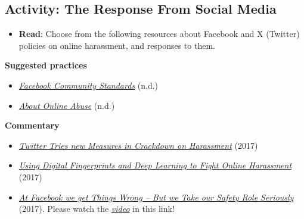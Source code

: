 \documentclass[
  letterpaper,
  DIV=11,
  numbers=noendperiod]{scrreprt}
\providecommand{\tightlist}{%
  \setlength{\itemsep}{0pt}\setlength{\parskip}{0pt}}\usepackage{longtable,booktabs,array}
\begin{document}
\subsection{Activity: The Response From Social
Media}\label{activity-the-response-from-social-media}

\begin{tcolorbox}[enhanced jigsaw, toprule=.15mm, colback=white, colframe=quarto-callout-note-color-frame, bottomtitle=1mm, leftrule=.75mm, coltitle=black, titlerule=0mm, rightrule=.15mm, colbacktitle=quarto-callout-note-color!10!white, left=2mm, title={Learning Activity}, opacitybacktitle=0.6, opacityback=0, breakable, toptitle=1mm, arc=.35mm, bottomrule=.15mm]

\begin{itemize}
\tightlist
\item
  \textbf{Read}: Choose from the following resources about Facebook and
  X (Twitter) policies on online harassment, and responses to them.
\end{itemize}

\textbf{Suggested practices}

\begin{itemize}
\tightlist
\item
  \emph{\href{https://transparency.fb.com/en-gb/policies/community-standards/?source=https\%3A\%2F\%2Fwww.facebook.com\%2Fcommunitystandards\%2F}{Facebook
  Community Standards}} (n.d.)
\item
  \href{https://help.twitter.com/en/safety-and-security/cyber-bullying-and-online-abuse}{\emph{About
  Online Abuse}} (n.d.)
\end{itemize}

\textbf{Commentary}

\begin{itemize}
\tightlist
\item
  \href{https://money.cnn.com/2017/02/07/technology/twitter-combat-harassment-features/index.html?iid=EL}{\emph{Twitter
  Tries new Measures in Crackdown on Harassment}} (2017)
\item
  \href{https://www.forbes.com/sites/kalevleetaru/2017/02/06/using-digital-fingerprints-and-deep-learning-to-fight-online-harassment/?sh=49fc9bf06908}{\emph{Using
  Digital Fingerprints and Deep Learning to Fight Online Harassment}}
  (2017)
\item
  \href{https://www.theguardian.com/commentisfree/2017/may/22/facebook-get-things-wrong-but-safety-role-seriously}{\emph{At
  Facebook we get Things Wrong -- But we Take our Safety Role
  Seriously}} (2017). Please watch the
  \href{https://www.theguardian.com/news/video/2017/may/21/the-facebook-files-sex-violence-and-hate-speech-video-explainer}{\emph{video}}
  in this link!
\end{itemize}

\end{tcolorbox}
\end{document}
